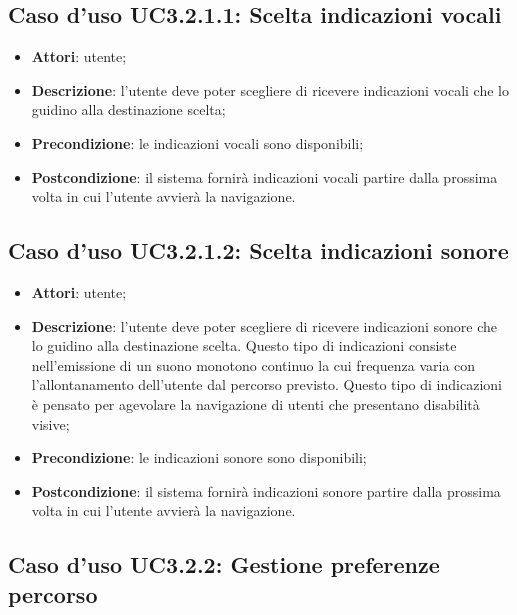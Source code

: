 \documentclass[../AnalisiDeiRequisiti.tex]{subfiles}
\begin{document}
\subsection{Caso d'uso UC3.2.1.1: Scelta indicazioni vocali}
\begin{itemize}
\item \textbf{Attori}: utente;
\item \textbf{Descrizione}: l'utente deve poter scegliere di ricevere indicazioni vocali che lo guidino alla destinazione scelta; 
      \item \textbf{Precondizione}: le indicazioni vocali sono disponibili;
    \item \textbf{Postcondizione}: il sistema fornirà indicazioni vocali partire dalla prossima volta in cui l'utente avvierà la navigazione.
  \end{itemize}
\hypertarget{UC3.2.1.2}{}
\subsection{Caso d'uso UC3.2.1.2: Scelta indicazioni sonore}
\begin{itemize}
\item \textbf{Attori}: utente;
\item \textbf{Descrizione}: l'utente deve poter scegliere di ricevere indicazioni sonore che lo guidino alla destinazione scelta. Questo tipo di indicazioni consiste nell'emissione di un suono monotono continuo la cui frequenza varia con l'allontanamento dell'utente dal percorso previsto. Questo tipo di indicazioni è pensato per agevolare la navigazione di utenti che presentano disabilità visive; 
      \item \textbf{Precondizione}: le indicazioni sonore sono disponibili;
    \item \textbf{Postcondizione}: il sistema fornirà indicazioni sonore partire dalla prossima volta in cui l'utente avvierà la navigazione.
  \end{itemize}
\hypertarget{UC3.2.2}{}
\subsection{Caso d'uso UC3.2.2: Gestione preferenze percorso}
\end{document}
